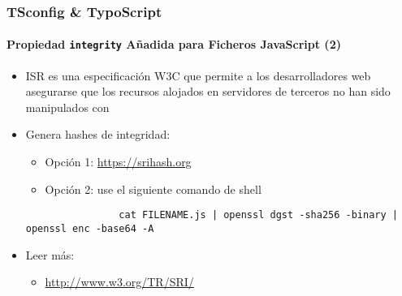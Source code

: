 \begin{frame}[fragile]
	\frametitle{TSconfig \& TypoScript}
	\framesubtitle{Propiedad \texttt{integrity} Añadida para Ficheros JavaScript (2)}


	\begin{itemize}

		\item ISR es una especificación W3C que permite a los desarrolladores web asegurarse
			que los recursos alojados en servidores de terceros no han sido manipulados con

		\item Genera hashes de integridad:

			\begin{itemize}
				\item Opción 1: \url{https://srihash.org}
				\item Opción 2: use el siguiente comando de shell
			\end{itemize}

			\begin{lstlisting}
				cat FILENAME.js | openssl dgst -sha256 -binary | openssl enc -base64 -A
			\end{lstlisting}

		\item Leer más:

			\begin{itemize}
				\item \url{http://www.w3.org/TR/SRI/}
			\end{itemize}

	\end{itemize}

\end{frame}


